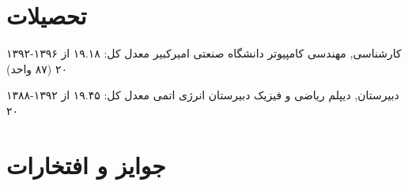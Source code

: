 \documentclass[]{friggeri-cv-fa} %
\begin{document}

\section{تحصیلات}

\begin{entrylist}


\entry
{۱۳۹۲-۱۳۹۶}
{کارشناسی, {\normalfont مهندسی کامپیوتر}}
{دانشگاه صنعتی امیرکبیر}
{معدل کل: ۱۹.۱۸ از ۲۰ (۸۷ واحد)}


\entry
{۱۳۸۸-۱۳۹۲}
{دبیرستان, {\normalfont دیپلم ریاضی و فیزیک}}
{دبیرستان انرژی اتمی}
{معدل کل: ۱۹.۴۵ از ۲۰}



\end{entrylist}


\section{جوایز و افتخارات}
\end{document}
